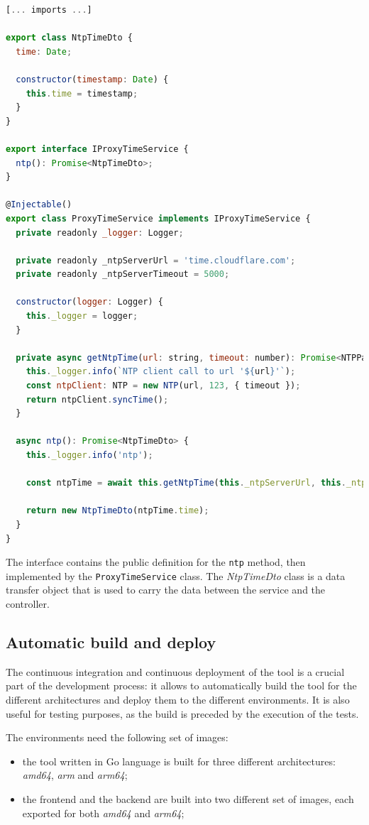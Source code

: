 \begin{lstlisting}[language=Javascript, caption={Proxy service class}, label={lst:proxy-service}]
[... imports ...]

export class NtpTimeDto {
  time: Date;

  constructor(timestamp: Date) {
    this.time = timestamp;
  }
}

export interface IProxyTimeService {
  ntp(): Promise<NtpTimeDto>;
}

@Injectable()
export class ProxyTimeService implements IProxyTimeService {
  private readonly _logger: Logger;

  private readonly _ntpServerUrl = 'time.cloudflare.com';
  private readonly _ntpServerTimeout = 5000;

  constructor(logger: Logger) {
    this._logger = logger;
  }

  private async getNtpTime(url: string, timeout: number): Promise<NTPPacket> {
    this._logger.info(`NTP client call to url '${url}'`);
    const ntpClient: NTP = new NTP(url, 123, { timeout });
    return ntpClient.syncTime();
  }

  async ntp(): Promise<NtpTimeDto> {
    this._logger.info('ntp');

    const ntpTime = await this.getNtpTime(this._ntpServerUrl, this._ntpServerTimeout);

    return new NtpTimeDto(ntpTime.time);
  }
}
\end{lstlisting}

The interface contains the public definition for the \texttt{ntp} method, then implemented by the \texttt{ProxyTimeService} class. The \textit{NtpTimeDto} class is a data transfer object that is used to carry the data between the service and the controller.

\subsection{Automatic build and deploy}

The continuous integration and continuous deployment of the tool is a crucial part of the development process: it allows to automatically build the tool for the different architectures and deploy them to the different environments. It is also useful for testing purposes, as the build is preceded by the execution of the tests.

The environments need the following set of images:
\begin{itemize}
  \item the tool written in Go language is built for three different architectures: \textit{amd64}, \textit{arm} and \textit{arm64};
  \item the frontend and the backend are built into two different set of images, each exported for both \textit{amd64} and \textit{arm64};
\end{itemize}

